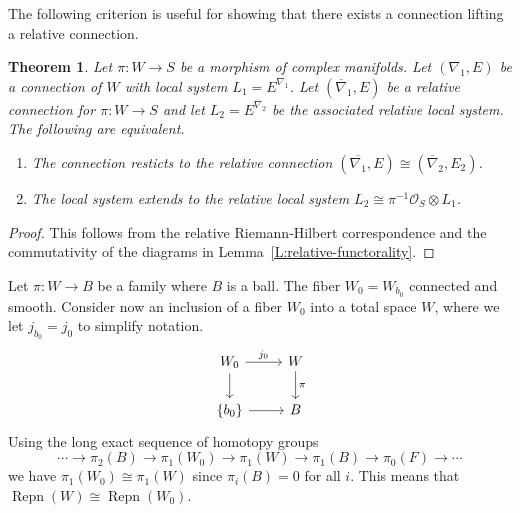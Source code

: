 \documentclass[12pt]{book}
\numberwithin{equation}{section}
\newtheorem{theorem}{Theorem}[subsection]
\theoremstyle{definition}
\theoremstyle{remark}
\newcommand{\Ocal}{\mathcal{O}}
\newcommand{\Repn}{\operatorname{Repn}}
\begin{document}
The following criterion is useful for showing that there exists a connection lifting a relative connection. 
\begin{theorem}
	Let $\pi:W \to S$ be a morphism of complex manifolds.
	Let $(\nabla_1,E)$ be a connection of $W$ with local system $L_1 = E^{\nabla_1}$. 
	Let $(\overline{\nabla}_1,E)$ be a relative connection for $\pi:W\to S$ and let $L_2 = E^{\overline{\nabla}_2}$ be the associated relative local system.
	The following are equivalent.
	\begin{enumerate}
		\item The connection resticts to the relative connection $(\overline{\nabla_1},E) \cong (\overline{\nabla}_2,E_2)$.
		\item The local system extends to the relative local system $L_2 \cong \pi^{-1}\Ocal_S\otimes L_1$.
	\end{enumerate}
\end{theorem}
\begin{proof}
	This follows from the relative Riemann-Hilbert correspondence and the commutativity of the diagrams in Lemma~\ref{L:relative-functorality}.
\end{proof}

Let $\pi: W\to B$ be a family where $B$ is a ball. 
The fiber $W_0=W_{b_0}$ connected and smooth. 
Consider now an inclusion of a fiber $W_{0}$ into a total space $W$, where we let $j_{b_0} =j_0$ to simplify notation.  
$$\begin{tikzcd}
W_{0} \ar[r, "j_{0}" ] \ar[d] & W\ar[d,"\pi"] \\
\lbrace b_0 \rbrace \ar[r] & B 
\end{tikzcd}
$$
Using the long exact sequence of homotopy groups 
$$ \cdots \to \pi_2(B) \to \pi_1(W_0) \to \pi_1(W) \to \pi_1(B) \to \pi_0(F) \to \cdots   $$ 
we have $\pi_1(W_0) \cong \pi_1(W)$ since $\pi_i(B)=0$ for all $i$.
This means that $\Repn(W)\cong \Repn(W_0)$.
\end{document}
